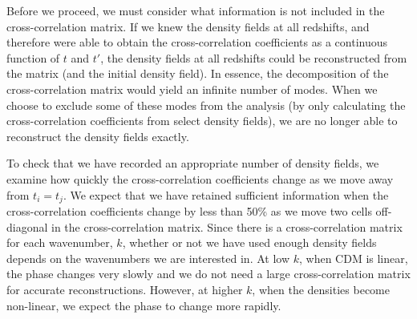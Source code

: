 \documentclass{aastex}
\begin{document}
Before we proceed, we must consider what information is not included
in the cross-correlation matrix. 
If we knew the density fields at all redshifts, and
therefore were able to obtain the cross-correlation coefficients as a continuous
function of $t$ and $t'$, the density fields at all redshifts could be
reconstructed from the matrix (and the initial
density field). 
In essence, the decomposition
of the cross-correlation matrix would yield an
infinite number of modes. %
When we choose to exclude some of these modes from the analysis (by
only calculating the cross-correlation coefficients from select
density fields), we
are no longer able to reconstruct the density fields exactly.

To check that we have recorded an appropriate number of density fields, 
we examine how quickly the cross-correlation
coefficients change as we move away from
$t_i=t_j$.  We expect that we have retained sufficient information
when the cross-correlation coefficients change by less than 50\% as we move
two cells off-diagonal in the cross-correlation matrix.  
Since there is a cross-correlation matrix
for each wavenumber, $k$, whether or not we have used
enough density fields depends on the wavenumbers we are
interested in.  At low $k$, when CDM is linear, the phase
changes very slowly and we do not need a large cross-correlation
matrix for accurate reconstructions.  However, at higher $k$,
when the densities become non-linear, we expect the phase to change
more rapidly.  %
\end{document}
